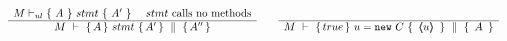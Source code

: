 \noindent
\small
\noindent
\begin{center}
$  
\begin{array}{lcr}
\inferruleNoName 
	{  
	  M \vdash_{ul} \{ \ A\ \} {\ stmt\ }\{\ A'\ \}   \ \ \ \ stmt\  \mbox{calls no methods}  %
	}
	{\hprovesN{M}  {A} {\ stmt \ } {A'} {A''} } 
&   &
\inferruleNoName 
	{ 
	 	
	}  	 
	{	 
 	\hprovesN  {M}  
	                {  true  }  
 			   {\  u = \prg{new}\ C \ }
 			   {\  \inside{u}\  }  { \ A \ }
	}
\end{array}
$
\end{center}

\normalsize


